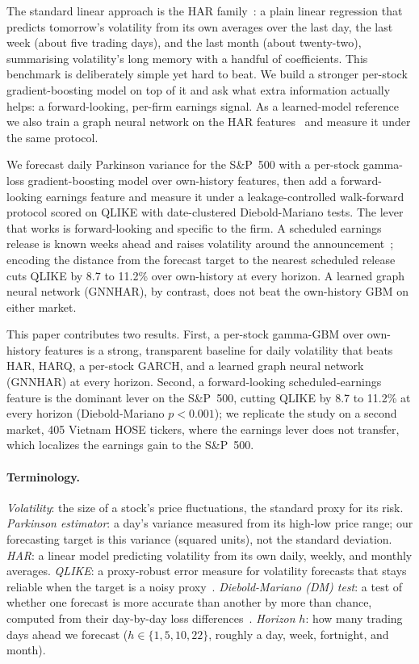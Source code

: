 \documentclass{llncs}
\begin{document}
The standard linear approach is the HAR family~\cite{corsi2009}: a plain linear regression that
predicts tomorrow's volatility from its own averages over the last day, the last week (about five
trading days), and the last month (about twenty-two), summarising volatility's long memory with a
handful of coefficients. This benchmark is deliberately simple yet hard to beat. We build a stronger
per-stock gradient-boosting model on top of it and ask what extra information actually helps: a
forward-looking, per-firm earnings signal. As a learned-model reference we also train a graph neural
network on the HAR features~\cite{gnnhar2024} and measure it under the same protocol.

We forecast daily Parkinson variance for the S\&P~500 with a per-stock gamma-loss gradient-boosting
model over own-history features, then add a forward-looking earnings feature and measure it under a
leakage-controlled walk-forward protocol scored on QLIKE with date-clustered Diebold-Mariano tests.
The lever that works is forward-looking and specific to the firm. A scheduled earnings release is
known weeks ahead and raises volatility around the announcement~\cite{patell1981}; encoding the distance from the
forecast target to the nearest scheduled release cuts QLIKE by 8.7 to 11.2\% over own-history at
every horizon. A learned graph neural network (GNNHAR), by contrast, does not beat the own-history GBM
on either market.

This paper contributes two results. First, a per-stock gamma-GBM over own-history features is a
strong, transparent baseline for daily volatility that beats HAR, HARQ, a per-stock GARCH, and a
learned graph neural network (GNNHAR) at every horizon. Second, a forward-looking scheduled-earnings
feature is the dominant lever on the S\&P~500, cutting QLIKE by 8.7 to 11.2\% at every horizon
(Diebold-Mariano $p<0.001$); we replicate the study on a second market, 405 Vietnam HOSE tickers,
where the earnings lever does not transfer, which localizes the earnings gain to the S\&P~500.

\paragraph{Terminology.}
\emph{Volatility}: the size of a stock's price fluctuations, the standard proxy for its risk.
\emph{Parkinson estimator}: a day's variance measured from its high-low price range; our forecasting
target is this variance (squared units), not the standard deviation.
\emph{HAR}: a linear model predicting volatility from its own daily, weekly, and monthly averages.
\emph{QLIKE}: a proxy-robust error measure for volatility forecasts that stays reliable when the
target is a noisy proxy~\cite{patton2011}.
\emph{Diebold-Mariano (DM) test}: a test of whether one forecast is more accurate than another by
more than chance, computed from their day-by-day loss differences~\cite{dm1995}.
\emph{Horizon} $h$: how many trading days ahead we forecast ($h\in\{1,5,10,22\}$, roughly a day, week,
fortnight, and month).
\end{document}
